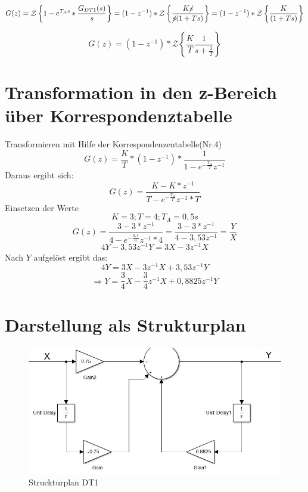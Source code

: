 \documentclass[12pt,a4paper]{report}
\begin{document}
\begin{equation}
G(z) = \mathcal{Z}\left\{1-e^{T_As}*\frac{G_{DT1}(s)}{s}\right\} = (1-z^{-1})*\mathcal{Z}\left\{\frac{K\cancel{s}}{\cancel{s}(1+Ts)}\right\} = (1-z^{-1})*\mathcal{Z}\left\{\frac{K}{(1+Ts)}\right\}
\end{equation}

\begin{equation}
G(z) = (1-z^{-1})*\mathcal{Z}\left\{\frac{K}{T}\frac{1}{s+\frac{1}{T}}\right\}
\end{equation}
\section{Transformation in den z-Bereich über Korrespondenztabelle}
Transformieren mit Hilfe der Korrespondenzentabelle(Nr.4)
\begin{equation}
G(z) = \frac{K}{T}*(1-z^{-1})*
\frac{1}
{1-e^{-\frac{T_A}{T}}z^{-1}}
\end{equation}
Daraus ergibt sich: 
\begin{equation}
G(z) = \frac{K-K*z^{-1}}
{T-e^{-\frac{T_A}{T}}z^{-1}*T} 
\end{equation}
Einsetzen der Werte
\begin{equation}
K = 3; T = 4; T_A = 0,5s
\end{equation}
\begin{equation}
G(z) = \frac{3-3*z^{-1}}
{4-e^{-\frac{0,5}{4}}z^{-1}*4} = \frac{3-3*z^{-1}}
{4-3,53z^{-1}} = \frac{Y}{X}
\end{equation}
\begin{equation}
4Y- 3,53z^{-1}Y = 3X -3z^{-1}X
\end{equation}
Nach $ Y $ aufgelöst ergibt das:
\begin{equation}
 4Y = 3X- 3z^{-1}X + 3,53z^{-1}Y
\end{equation}
\begin{equation}
\Rightarrow Y = \frac{3}{4}X- \frac{3}{4}z^{-1}X + 0,8825z^{-1}Y
\end{equation}
\section{Darstellung als Strukturplan}
\begin{figure}[ht]
	\centering
	\includegraphics[width=0.8\linewidth]{marius/DT1}
	\caption{Struckturplan DT1}
	\label{fig:DT1}
\end{figure}
\end{document}
